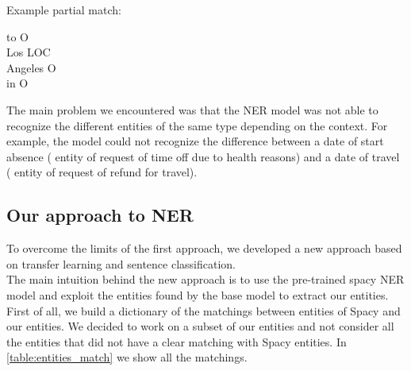 Example partial match:
\begin{adjustwidth}{1cm}{}
    to O\\
    Los LOC\\
    Angeles O\\
    in O\\
\end{adjustwidth}
The main problem we encountered was that the NER model was not able to recognize the different entities of the same type depending on the context. For example, the model could not recognize the difference between a date of start absence ( entity of request of time off due to health reasons) and a date of travel ( entity of request of refund for travel).

\subsection{Our approach to NER}
To overcome the limits of the first approach, we developed a new approach based on transfer learning and sentence classification. \\
The main intuition behind the new approach is to use the pre-trained spacy NER model and exploit the entities found by the base model to extract our entities. \\
First of all, we build a dictionary of the matchings between entities of Spacy and our entities. We decided to work on a subset of our entities and not consider all the entities that did not have a clear matching with Spacy entities. In \autoref{table:entities_match} we show all the matchings. 
\begin{table}[h]    
    \caption{Matching of our entities with Spacy entities}\label{table:entities_match}
\end{table}
